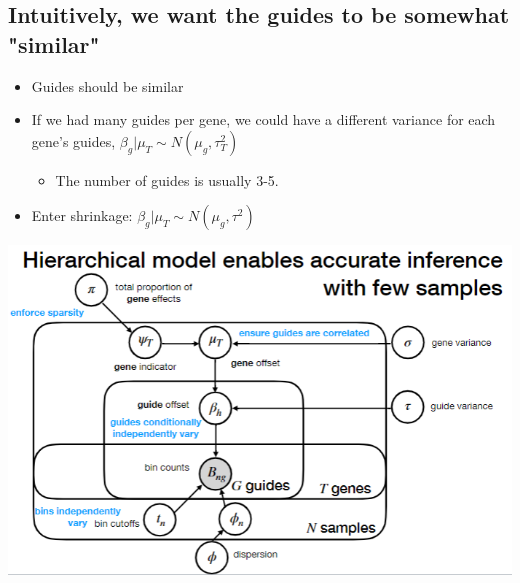 \documentclass[10pt]{article}
\begin{document}
\subsection*{Intuitively, we want the guides to be somewhat "similar"}
\begin{itemize}
    \item Guides should be similar
    \item If we had many guides per gene, we could have a different variance for each gene's guides, $\beta_g \vert \mu_T \sim N(\mu_g, \tau^2_T)$
    \begin{itemize}
        \item The number of guides is usually 3-5.
    \end{itemize}
    \item Enter shrinkage: $\beta_g \vert \mu_T \sim N(\mu_g, \tau^2)$
\end{itemize}

\begin{center}
    \includegraphics*[scale=0.8]{W10_2.png}
\end{center}
\end{document}
